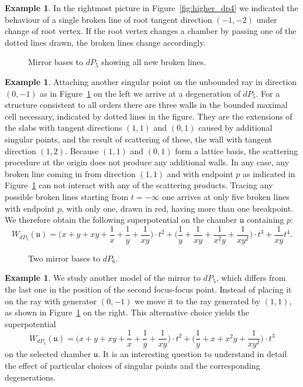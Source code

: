 \documentclass[11pt,letter]{amsart}
\theoremstyle{definition}
\newtheorem{example}[theorem]{Example}
\theoremstyle{remark}
\numberwithin{equation}{section}
\numberwithin{figure}{section}
\newcommand {\fou}  {\mathfrak{u}}
\begin{document}
\begin{example}
In the rightmost picture in Figure~\ref{fig:higher_dp4} we indicated the
behaviour of a single broken line of root tangent direction $(-1,-2)$ under
change of root vertex. If the root vertex changes a chamber by passing one of
the dotted lines drawn, the broken lines change accordingly. 
\end{example}

\begin{figure}

\caption{Mirror bases to $dP_5$ showing all new broken lines.}
\label{fig:higher_dp5}
\end{figure}

\begin{example} \label{ex: dp5}
Attaching another singular point on the unbounded ray in direction $(0,-1)$ as
in Figure~\ref{fig:higher_dp5} on the left we arrive at a degeneration of
$dP_5$. For a structure consistent to all orders there are three walls in the
bounded maximal cell necessary, indicated by dotted lines in the figure. They
are the extensions of the slabs with tangent directions $(1,1)$ and $(0,1)$
caused by additional singular points, and the result of scattering of these, the
wall with tangent direction $(1,2)$. Because $(1,1)$ and $(0,1)$ form a lattice
basis, the scattering procedure at the origin does not produce any additional
walls. In any case, any broken line coming in from direction $(1,1)$ and with
endpoint $p$ as indicated in Figure~\ref{fig:higher_dp5} can not interact with
any of the scattering products. Tracing any possible broken lines starting from
$t=-\infty$ one arrives at only five broken lines with endpoint $p$, with only
one, drawn in red, having more than one breakpoint. We therefore obtain the
following superpotential on the chamber $\fou$ containing $p$:
\[
 W_{dP_5}(\fou) = \Big(x +  y +  xy + \frac{1}{x} + \frac{1}{y} +
\frac{1}{xy}\Big) \cdot t^2  +  \Big( \frac{1}{y} +  \frac{1}{xy} +
\frac{1}{x^2y} + \frac{1}{xy^2}\Big)
\cdot t^3 +  \frac{1}{xy}t^4.
\]
\end{example}

\begin{figure}

\caption{Two mirror bases to $dP_6$.}
\label{fig:higher_dp6}
\end{figure}
\begin{example}

We study another model of the mirror to $dP_5$, which differs from
the last one in the position of the second focus-focus point.
Instead of placing it on the ray with generator $(0,-1)$ we move it
to the ray generated by $(1,1)$, as shown in
Figure~\ref{fig:higher_dp5} on the right. This alternative
choice yields the superpotential
\[
W_{dP_5}(\fou) =  \Big(x + y +  xy + \frac{1}{x} +
\frac{1}{y} +
\frac{1}{xy}\Big) \cdot t^2 +
\Big( \frac{1}{y} + x + x^2y  + \frac{1}{xy^2}\Big) \cdot t^3
\]
on the selected chamber $\fou$.
It is an interesting question to understand in detail the effect of
particular choices of singular points and the corresponding
degenerations.
\end{example}
\end{document}
